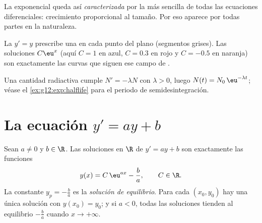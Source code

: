\begin{remark}
La exponencial queda así \emph{caracterizada} por la más sencilla de todas
las ecuaciones diferenciales: crecimiento proporcional al tamaño. Por eso
aparece por todas partes en la naturaleza.
\end{remark}

\begin{omfigure}

{\small La  $y' = y$ prescribe una  en cada punto del
plano (segmentos grises). Las soluciones $C\eu^{x}$ (aquí $C = 1$ en azul,
$C = 0.3$ en rojo y $C = -0.5$ en naranja) son exactamente las curvas que
siguen ese campo de .}
\end{omfigure}

\begin{example}\label{ex:g12:diffeq:decay}
Una cantidad radiactiva cumple $N' = -\lambda N$ con $\lambda > 0$, luego
$N(t) = N_0\,\eu^{-\lambda t}$; véase el \cref{ex:g12:exp:halflife} para el
periodo de semidesintegración.
\end{example}

\section{La ecuación \texorpdfstring{$y' = ay + b$}{y' = ay + b}}

\begin{theorem}[Soluciones de $y' = ay + b$]\label{thm:g12:diffeq:affine}
Sean $a \neq 0$ y $b \in \R$. Las soluciones en $\R$ de $y' = ay + b$ son
exactamente las funciones
\[
y(x) = C\,\eu^{ax} - \frac{b}{a}, \qquad C \in \R .
\]
La  constante $y_p = -\frac ba$ es la \emph{solución de equilibrio}.
Para cada $(x_0, y_0)$ hay una única solución con $y(x_0) = y_0$; y si
$a < 0$, todas las soluciones tienden al equilibrio $-\frac ba$ cuando
$x \to +\infty$.
\end{theorem}

